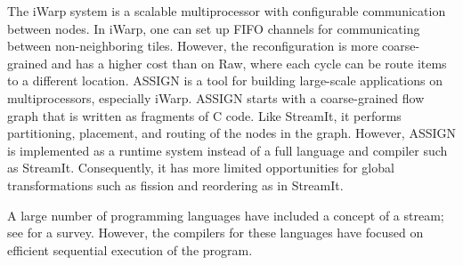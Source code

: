 The iWarp system \cite{iwarp} is a scalable multiprocessor with
configurable communication between nodes.  In iWarp, one can set up
FIFO channels for communicating between non-neighboring tiles.
However, the reconfiguration is more coarse-grained and has a higher
cost than on Raw, where each cycle can be route items to a different
location.  ASSIGN \cite{assign} is a tool for building large-scale
applications on multiprocessors, especially iWarp.  ASSIGN starts with
a coarse-grained flow graph that is written as fragments of C code.
Like StreamIt, it performs partitioning, placement, and routing of the
nodes in the graph.  However, ASSIGN is implemented as a runtime
system instead of a full language and compiler such as StreamIt.
Consequently, it has more limited opportunities for global
transformations such as fission and reordering as in StreamIt.

A large number of programming languages have included a concept of a
stream; see \cite{survey97} for a survey. However, the compilers for
these languages have focused on efficient sequential execution of the
program.


% 
%
